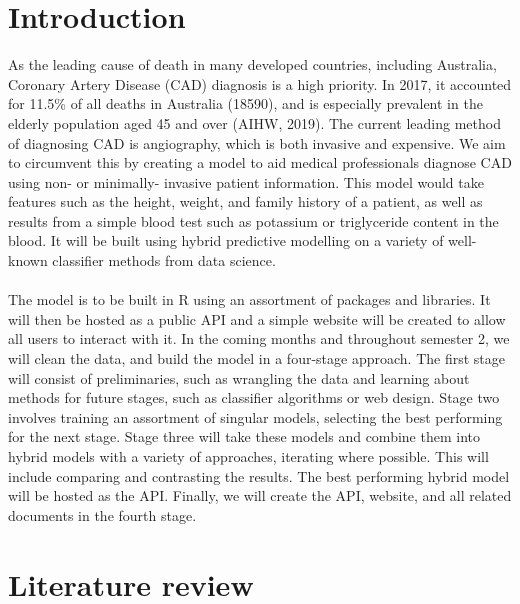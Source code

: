 \documentclass[a4paper, 12pt]{article}
\begin{document}
\section{Introduction}
As the leading cause of death in many developed countries, including Australia, Coronary Artery Disease (CAD) diagnosis is a high priority. In 2017, it accounted for 11.5\% of all deaths in Australia (18590), and is especially prevalent in the elderly population aged 45 and over (AIHW, 2019). The current leading method of diagnosing CAD is angiography, which is both invasive and expensive. We aim to circumvent this by creating a model to aid medical professionals diagnose CAD using non- or minimally- invasive patient information. This model would take features such as the height, weight, and family history of a patient, as well as results from a simple blood test such as potassium or triglyceride content in the blood. It will be built using hybrid predictive modelling on a variety of well-known classifier methods from data science. 
\\\\
The model is to be built in R using an assortment of packages and libraries. It will then be hosted as a public API and a simple website will be created to allow all users to interact with it. In the coming months and throughout semester 2, we will clean the data, and build the model in a four-stage approach. The first stage will consist of preliminaries, such as wrangling the data and learning about methods for future stages, such as classifier algorithms or web design. Stage two involves training an assortment of singular models, selecting the best performing for the next stage. Stage three will take these models and combine them into hybrid models with a variety of approaches, iterating where possible. This will include comparing and contrasting the results. The best performing hybrid model will be hosted as the API. Finally, we will create the API, website, and all related documents in the fourth stage.

\section{Literature review}
\end{document}
